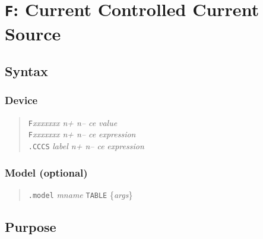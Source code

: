 %
%
%
%
\section{{\tt F}: Current Controlled Current Source}
\subsection{Syntax}
\subsubsection{Device}
\begin{verse}
{\tt F}{\it xxxxxxx n+ n-- ce} {\it value}\\
{\tt F}{\it xxxxxxx n+ n-- ce} {\it expression}\\
{\tt .CCCS} {\it label n+ n-- ce} {\it expression}
\end{verse}
\subsubsection{Model (optional)}
\begin{verse}
{\tt .model} {\it mname} {\tt TABLE} \{{\it args}\}
\end{verse}
\subsection{Purpose}

